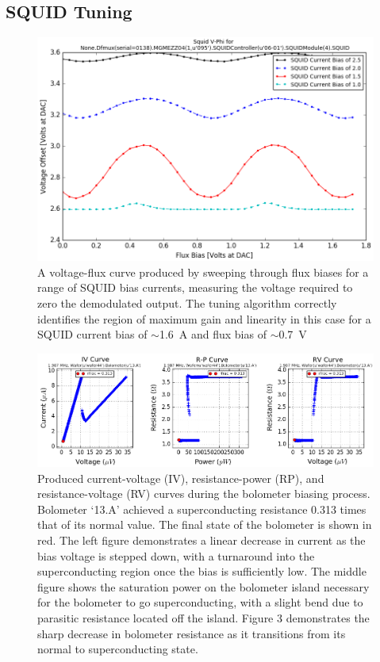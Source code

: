 \documentclass[iop]{emulateapj}
\begin{document}
\subsection{SQUID Tuning}

\begin{figure}
	\includegraphics[width=\linewidth]{squid}
	\centering
	\caption{A voltage-flux curve produced by sweeping through flux biases for a range of SQUID bias currents, measuring the voltage required to zero the demodulated output.  The tuning algorithm correctly identifies the region of maximum gain and linearity in this case for a SQUID current bias of $\sim$1.6~A and flux bias of $\sim$0.7~V}
	\label{vphi}
\end{figure}

\begin{figure}
	\includegraphics[width=\textwidth]{bolometer_bias}
	\centering
	\caption{Produced current-voltage (IV), resistance-power (RP), and resistance-voltage (RV) curves during the bolometer biasing process.  Bolometer `13.A' achieved a superconducting resistance 0.313 times that of its normal value.  The final state of the bolometer is shown in red.  The left figure demonstrates a linear decrease in current as the bias voltage is stepped down, with a turnaround into the superconducting region once the bias is sufficiently low.  The middle figure shows the saturation power on the bolometer island necessary for the bolometer to go superconducting, with a slight bend due to parasitic resistance located off the island.  Figure 3 demonstrates the sharp decrease in bolometer resistance as it transitions from its normal to superconducting state.}
	\label{bias}
\end{figure}
\end{document}
